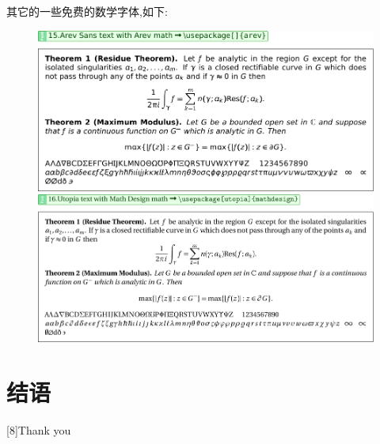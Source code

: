 \documentclass[12pt]{article}
\newcommand{\scale}[2]{%
    \scalebox{#1}[#1]{#2}}
\begin{document}
\clearpage
{}\;其它的一些免费的数学字体,如下:
\begin{figure}[!htb]
    \centering
    \includegraphics[width=.95\linewidth]{./MathFontVision/Arev-Sans-Text-with-Arev-Math.pdf}

    \vspace*{2em}
    \includegraphics[width=.95\linewidth]{./MathFontVision/Utopia-Text-with-Math-Design-Math.pdf}
\end{figure}


\section{结语}
\begin{center}
    \scale{8}{\FathonyKing Thank you} 
\end{center}
\end{document}
